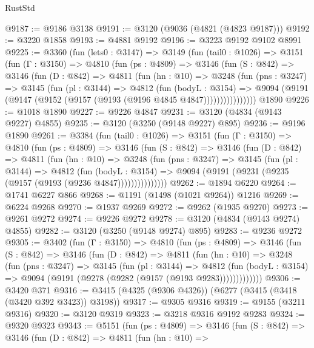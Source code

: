\begin{lexlean}{RustStd}
\begin{coremodule}
@9187 := @9186 @3138
@9191 := @3120 (@9036 (@4821 (@4823 @9187)))
@9192 := @3220 @1858
@9193 := @4881 @9192
@9196 := @3223 @9192 @9102 @8991
@9225 := @3360
    (fun (lets0 : @3147) =>
    @3149
      (fun (tail0 : @1026) =>
      @3151
        (fun (Γ : @3150) =>
        @4810
          (fun (ps : @4809) =>
          @3146
            (fun (S : @842) =>
            @3146
              (fun (D : @842) =>
              @4811
                (fun (hn : @10) =>
                @3248
                  (fun (pns : @3247) =>
                  @3145
                    (fun (pl : @3144) =>
                    @4812
                      (fun (bodyL : @3154) =>
                      @9094 (@9191 (@9147 (@9152 (@9157 (@9193 (@9196 @4845 @4847))))))))))))))))
    @1890
@9226 := @1018 @1890
@9227 := @9226 @4847
@9231 := @3120 (@4834 (@9143 @9227) @4855)
@9235 := @3120 (@3250 (@9148 @9227) @895)
@9236 := @9196 @1890
@9261 := @3384
    (fun (tail0 : @1026) =>
    @3151
      (fun (Γ : @3150) =>
      @4810
        (fun (ps : @4809) =>
        @3146
          (fun (S : @842) =>
          @3146
            (fun (D : @842) =>
            @4811
              (fun (hn : @10) =>
              @3248
                (fun (pns : @3247) =>
                @3145
                  (fun (pl : @3144) =>
                  @4812
                    (fun (bodyL : @3154) =>
                    @9094 (@9191 (@9231 (@9235 (@9157 (@9193 (@9236 @4847)))))))))))))))
@9262 := @1894 @6220
@9264 := @1741 @6227 @866
@9268 := @1191 (@1498 (@1021 @9264)) @1216
@9269 := @6224 @9268
@9270 := @1937 @9269
@9272 := @9262 (@1935 @9270)
@9273 := @9261 @9272
@9274 := @9226 @9272
@9278 := @3120 (@4834 (@9143 @9274) @4855)
@9282 := @3120 (@3250 (@9148 @9274) @895)
@9283 := @9236 @9272
@9305 := @3402
    (fun (Γ : @3150) =>
    @4810
      (fun (ps : @4809) =>
      @3146
        (fun (S : @842) =>
        @3146
          (fun (D : @842) =>
          @4811
            (fun (hn : @10) =>
            @3248
              (fun (pns : @3247) =>
              @3145
                (fun (pl : @3144) =>
                @4812
                  (fun (bodyL : @3154) =>
                  @9094 (@9191 (@9278 (@9282 (@9157 (@9193 @9283)))))))))))))
@9306 := @3420 @371
@9316 := @3415 (@4325 (@9306 @4326)) (@6277 (@3415 (@3418 (@3420 @392 @3423)) @3198))
@9317 := @9305 @9316
@9319 := @9155 (@3211 @9316)
@9320 := @3120 @9319
@9323 := @3218 @9316 @9192 @9283
@9324 := @9320 @9323
@9343 := @5151
    (fun (ps : @4809) =>
    @3146
      (fun (S : @842) =>
      @3146
        (fun (D : @842) =>
        @4811
          (fun (hn : @10) =>

\end{coremodule}
\end{lexlean}
